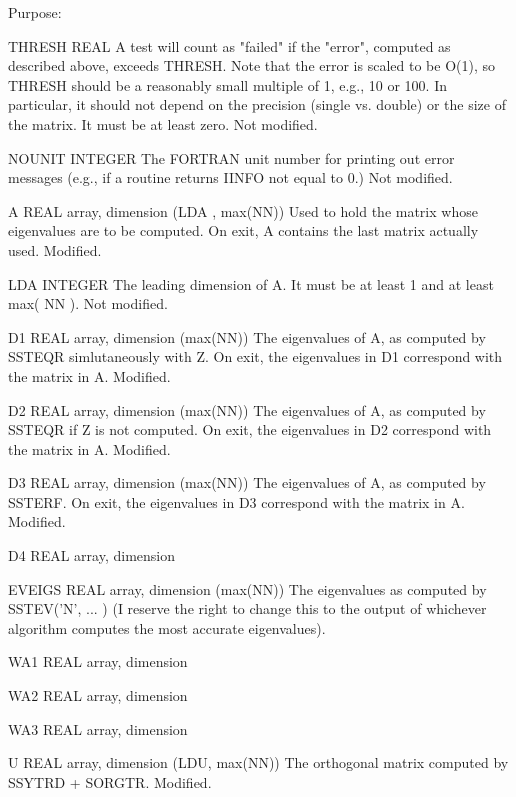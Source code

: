 \begin{DoxyParagraph}{Purpose\+: }
\begin{DoxyVerb}
  THRESH  REAL
          A test will count as "failed" if the "error", computed as
          described above, exceeds THRESH.  Note that the error
          is scaled to be O(1), so THRESH should be a reasonably
          small multiple of 1, e.g., 10 or 100.  In particular,
          it should not depend on the precision (single vs. double)
          or the size of the matrix.  It must be at least zero.
          Not modified.

  NOUNIT  INTEGER
          The FORTRAN unit number for printing out error messages
          (e.g., if a routine returns IINFO not equal to 0.)
          Not modified.

  A       REAL array, dimension (LDA , max(NN))
          Used to hold the matrix whose eigenvalues are to be
          computed.  On exit, A contains the last matrix actually
          used.
          Modified.

  LDA     INTEGER
          The leading dimension of A.  It must be at
          least 1 and at least max( NN ).
          Not modified.

  D1      REAL array, dimension (max(NN))
          The eigenvalues of A, as computed by SSTEQR simlutaneously
          with Z.  On exit, the eigenvalues in D1 correspond with the
          matrix in A.
          Modified.

  D2      REAL array, dimension (max(NN))
          The eigenvalues of A, as computed by SSTEQR if Z is not
          computed.  On exit, the eigenvalues in D2 correspond with
          the matrix in A.
          Modified.

  D3      REAL array, dimension (max(NN))
          The eigenvalues of A, as computed by SSTERF.  On exit, the
          eigenvalues in D3 correspond with the matrix in A.
          Modified.

  D4      REAL array, dimension

  EVEIGS  REAL array, dimension (max(NN))
          The eigenvalues as computed by SSTEV('N', ... )
          (I reserve the right to change this to the output of
          whichever algorithm computes the most accurate eigenvalues).

  WA1     REAL array, dimension

  WA2     REAL array, dimension

  WA3     REAL array, dimension

  U       REAL array, dimension (LDU, max(NN))
          The orthogonal matrix computed by SSYTRD + SORGTR.
          Modified.


\end{DoxyVerb}
\end{DoxyParagraph}
